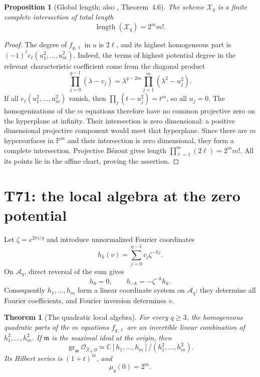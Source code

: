 \documentclass[11pt,a4paper]{article}
\newtheorem{theorem}{Theorem}
\newtheorem{proposition}[lemma]{Proposition}
\theoremstyle{definition}
\theoremstyle{remark}
\newcommand{\C}{\mathbb C}
\newcommand{\A}{\mathcal A}
\newcommand{\X}{\mathcal X}
\newcommand{\gr}{\operatorname{gr}}
\newcommand{\length}{\operatorname{length}}
\begin{document}
\begin{proposition}[Global length; also \cite{FFORS}, Theorem~4.6]\label{prop:global}
The scheme $\X_q$ is a finite complete intersection of total length
\[
 \length(\X_q)=2^m m!.
\]
\end{proposition}
\begin{proof}
The degree of $f_{q,\ell}$ in $u$ is $2\ell$, and its highest homogeneous
part is $(-1)^\ell e_\ell(u_1^2,\ldots,u_m^2)$. Indeed, the terms of highest
potential degree in the relevant characteristic coefficient come from the
diagonal product
\[
 \prod_{j=0}^{q-1}(\lambda-v_j)
  =\lambda^{q-2m}\prod_{j=1}^m(\lambda^2-u_j^2).
\]
If all $e_\ell(u_1^2,\ldots,u_m^2)$ vanish, then
$\prod_j(t-u_j^2)=t^m$, so all $u_j=0$.
The homogenizations of the $m$ equations therefore have no common projective
zero on the hyperplane at infinity. Their intersection is zero dimensional:
a positive dimensional projective component would meet that hyperplane.
Since there are $m$ hypersurfaces in $\mathbb P^m$ and their intersection
is zero dimensional, they form a complete intersection. Projective B\'ezout
gives length $\prod_{\ell=1}^m(2\ell)=2^m m!$. All its points lie in the
affine chart, proving the assertion.
\end{proof}

\section{T71: the local algebra at the zero potential}

Let $\zeta=e^{2\pi i/q}$ and introduce unnormalized Fourier coordinates
\begin{equation}\label{eq:fourier}
 h_k(v)=\sum_{j=0}^{q-1}v_j\zeta^{-kj}.
\end{equation}
On $\A_q$, direct reversal of the sum gives
\begin{equation}\label{eq:antiFourier}
 h_0=0,\qquad h_{-k}=-\zeta^{-k}h_k.
\end{equation}
Consequently $h_1,\ldots,h_m$ form a linear coordinate system on $\A_q$:
they determine all Fourier coefficients, and Fourier inversion determines $v$.

\begin{theorem}[The quadratic local algebra]\label{thm:origin}
For every $q\geq3$, the homogeneous quadratic parts of the $m$ equations
$f_{q,\ell}$ are an invertible linear combination of
$h_1^2,\ldots,h_m^2$. If $\mathfrak m$ is the maximal ideal at the origin,
then
\begin{equation}\label{eq:localgr}
 \gr_{\mathfrak m}\mathcal O_{\X_q,0}
 \simeq\C[h_1,\ldots,h_m]/(h_1^2,\ldots,h_m^2).
\end{equation}
Its Hilbert series is $(1+t)^m$, and
\begin{equation}\label{eq:originlength}
 \mu_q(0)=2^m.
\end{equation}
\end{theorem}
\end{document}
